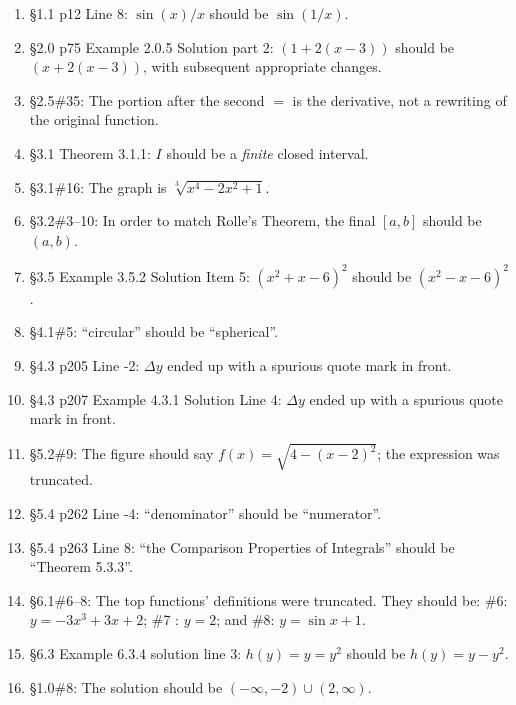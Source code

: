 \documentclass{amsart}
\makeatletter
\newcommand{\reforzero}[1]{%
 \@ifundefined{r@#1}{0}{\ref{#1}}%
}
\makeatother
\begin{document}
\begin{enumerate}\setcounter{enumi}{\reforzero{2018-07-13}}
\item \S1.1 p12 Line 8: $\sin(x)/x$ should be $\sin(1/x)$.
\item \S2.0 p75 Example 2.0.5 Solution part 2: $(1+2(x-3))$ should be $(x+2(x-3))$, with subsequent appropriate changes.
\item \S2.5\#35: The portion after the second $=$ is the derivative, not a rewriting of the original function.
\item \S3.1 Theorem 3.1.1: $I$ should be a \emph{finite} closed interval.
\item \S3.1\#16: The graph is $\sqrt[3]{x^4-2x^2+1}$.
\item \S3.2\#3--10: In order to match Rolle's Theorem, the final $[a,b]$ should be $(a,b)$.
\item \S3.5 Example 3.5.2 Solution Item 5: $(x^2+x-6)^2$ should be $(x^2-x-6)^2$.
\item \S4.1\#5: ``circular'' should be ``spherical''.
\item \S4.3 p205 Line -2: $\Delta y$ ended up with a spurious quote mark in front.
\item \S4.3 p207 Example 4.3.1 Solution Line 4: $\Delta y$ ended up with a spurious quote mark in front.
\item \S5.2\#9: The figure should say $f(x)=\sqrt{4-(x-2)^2}$; the expression was truncated.
\item \S5.4 p262 Line -4: ``denominator'' should be ``numerator''.
\item \S5.4 p263 Line 8: ``the Comparison Properties of Integrals'' should be ``Theorem 5.3.3''.
\item \S6.1\#6--8: The top functions' definitions were truncated.  They should be: \#6: $y=-3x^3+3x+2$; \#7 : $y=2$; and \#8: $y=\sin x+1$.
\item \S6.3 Example 6.3.4 solution line 3: $h(y)=y=y^2$ should be $h(y)=y-y^2$.
%
\item \S1.0\#8: The solution should be $(-\infty,-2)\cup(2,\infty)$.

\end{enumerate}
\end{document}
